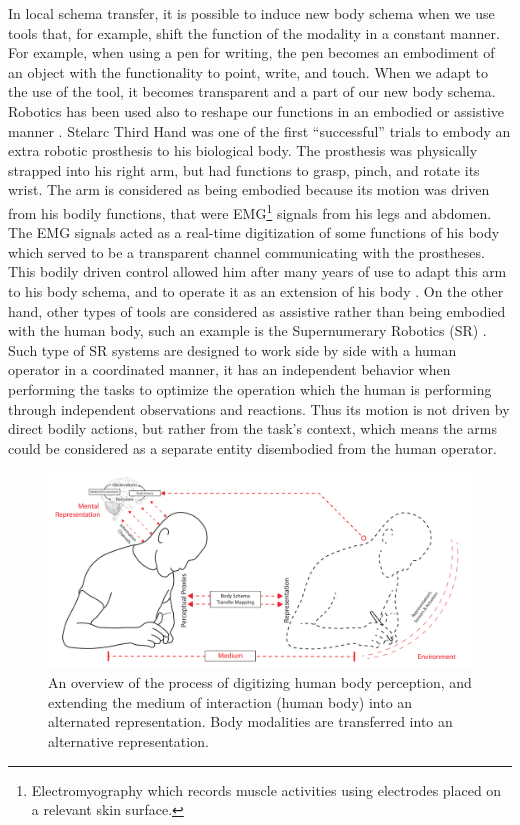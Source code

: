 In local schema transfer, it is possible to induce new body schema when we use tools that, for example, shift the function of the modality in a constant manner. For example, when using a pen for writing, the pen becomes an embodiment of an object with the functionality to point, write, and touch. When we adapt to the use of the tool, it becomes transparent and a part of our new body schema. Robotics has been used also to reshape our functions in an embodied or assistive manner . Stelarc Third Hand \cite{kac1997foundation} was one of the first ``successful'' trials to embody an extra robotic prosthesis to his biological body. The prosthesis was physically strapped into his right arm, but had functions to grasp, pinch, and rotate its wrist. The arm is considered as being embodied because its motion was driven from his bodily functions, that were EMG\footnote{Electromyography which records muscle activities using electrodes placed on a relevant skin surface.} signals from his legs and abdomen. The EMG signals acted as a real-time digitization of some functions of his body which served to be a transparent channel communicating with the prostheses. This bodily driven control allowed him after many years of use to adapt this arm to his body schema, and to operate it as an extension of his body \cite{stelarc1980thirdhand}. On the other hand, other types of tools are considered as assistive rather than being embodied with the human body, such an example is the Supernumerary Robotics (SR) \cite{llorens2012based,bonilla2014robot, parietti2014bracing, wu2014bio}. Such type of SR systems are designed to work side by side with a human operator in a coordinated manner, it has an independent behavior when performing the tasks to optimize the operation which the human is performing through independent observations and reactions. Thus its motion is not driven by direct bodily actions, but rather from the task's context, which means the arms could be considered as a separate entity disembodied from the human operator.

\begin{figure}[htpb]
  \centering
	  \includegraphics[width=1\linewidth]{figures/intro/representation.pdf}
  \captionsetup{justification=centering}
  \caption{An overview of the process of digitizing human body perception, and extending the medium of interaction (human body) into an alternated representation. Body modalities are transferred into an alternative representation.}
  \label{fig:intro-digitalRep}
\end{figure}

